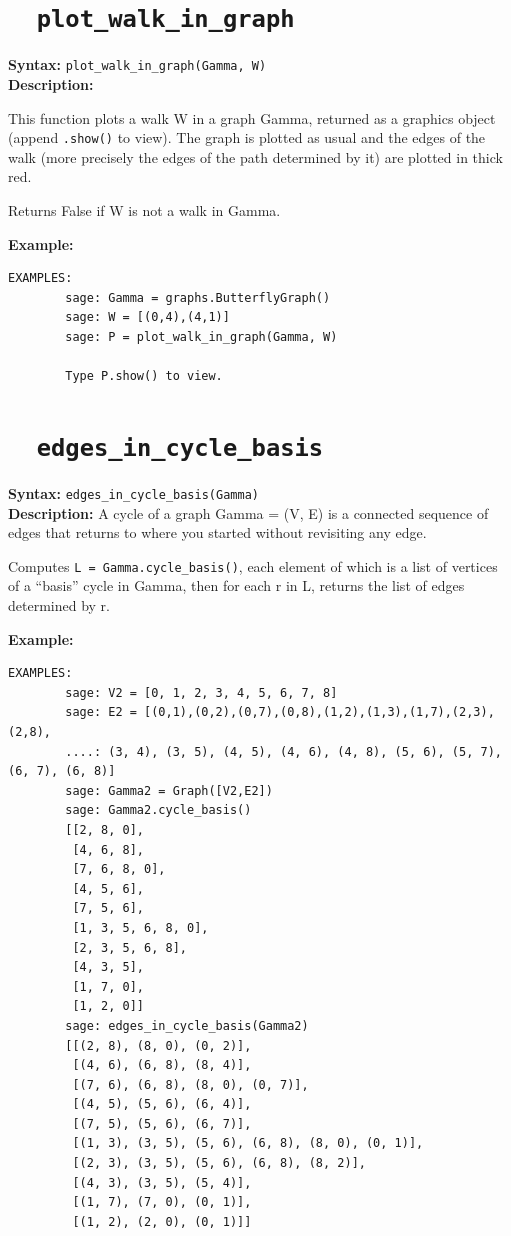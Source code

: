 \documentclass{article}
\begin{document}
\section{\tt \ \ plot\_walk\_in\_graph}

\textbf{Syntax:} \verb}plot_walk_in_graph(Gamma, W)}\\

\textbf{Description:}

This function plots a walk W in a graph Gamma, returned as a graphics
    object (append \verb+.show()+ to view). The graph is plotted as usual 
    and the edges of the walk (more precisely the edges of the path 
    determined by it) are plotted in thick red.
    
    Returns False if W is not a walk in Gamma.

\textbf{Example:}
\begin{verbatim}
EXAMPLES:
        sage: Gamma = graphs.ButterflyGraph()
        sage: W = [(0,4),(4,1)]
        sage: P = plot_walk_in_graph(Gamma, W)

        Type P.show() to view.
\end{verbatim}

\section{\tt \ \ edges\_in\_cycle\_basis}

\textbf{Syntax:} \verb+edges_in_cycle_basis(Gamma)+\\

\textbf{Description:}
A cycle of a graph Gamma = (V, E) is a connected sequence of edges that returns
to where you started without revisiting any edge.

Computes {\tt L = Gamma.cycle\_basis()}, each element of which is a 
list of vertices of a ``basis'' cycle in Gamma, then for each r in L,
returns the list of edges determined by r.

\textbf{Example:}
\begin{verbatim}
EXAMPLES:
        sage: V2 = [0, 1, 2, 3, 4, 5, 6, 7, 8]
        sage: E2 = [(0,1),(0,2),(0,7),(0,8),(1,2),(1,3),(1,7),(2,3),(2,8),
        ....: (3, 4), (3, 5), (4, 5), (4, 6), (4, 8), (5, 6), (5, 7), (6, 7), (6, 8)]
        sage: Gamma2 = Graph([V2,E2])
        sage: Gamma2.cycle_basis()
        [[2, 8, 0],
         [4, 6, 8],
         [7, 6, 8, 0],
         [4, 5, 6],
         [7, 5, 6],
         [1, 3, 5, 6, 8, 0],
         [2, 3, 5, 6, 8],
         [4, 3, 5],
         [1, 7, 0],
         [1, 2, 0]]
        sage: edges_in_cycle_basis(Gamma2)
        [[(2, 8), (8, 0), (0, 2)],
         [(4, 6), (6, 8), (8, 4)],
         [(7, 6), (6, 8), (8, 0), (0, 7)],
         [(4, 5), (5, 6), (6, 4)],
         [(7, 5), (5, 6), (6, 7)],
         [(1, 3), (3, 5), (5, 6), (6, 8), (8, 0), (0, 1)],
         [(2, 3), (3, 5), (5, 6), (6, 8), (8, 2)],
         [(4, 3), (3, 5), (5, 4)],
         [(1, 7), (7, 0), (0, 1)],
         [(1, 2), (2, 0), (0, 1)]]
\end{verbatim}
\end{document}
